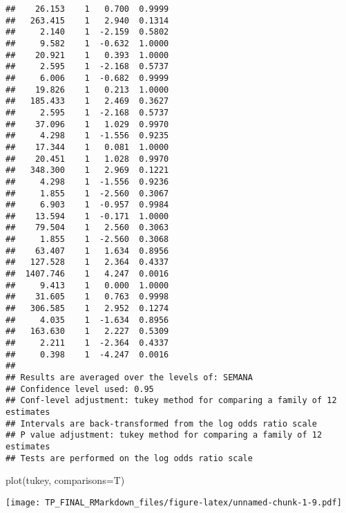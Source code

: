 \documentclass[
]{article}
\newenvironment{Shaded}{\begin{snugshade}}{\end{snugshade}}
\newcommand{\AttributeTok}[1]{\textcolor[rgb]{0.77,0.63,0.00}{#1}}
\newcommand{\FunctionTok}[1]{\textcolor[rgb]{0.00,0.00,0.00}{#1}}
\newcommand{\NormalTok}[1]{#1}
\begin{document}
\begin{verbatim}
##    26.153    1   0.700  0.9999
##   263.415    1   2.940  0.1314
##     2.140    1  -2.159  0.5802
##     9.582    1  -0.632  1.0000
##    20.921    1   0.393  1.0000
##     2.595    1  -2.168  0.5737
##     6.006    1  -0.682  0.9999
##    19.826    1   0.213  1.0000
##   185.433    1   2.469  0.3627
##     2.595    1  -2.168  0.5737
##    37.096    1   1.029  0.9970
##     4.298    1  -1.556  0.9235
##    17.344    1   0.081  1.0000
##    20.451    1   1.028  0.9970
##   348.300    1   2.969  0.1221
##     4.298    1  -1.556  0.9236
##     1.855    1  -2.560  0.3067
##     6.903    1  -0.957  0.9984
##    13.594    1  -0.171  1.0000
##    79.504    1   2.560  0.3063
##     1.855    1  -2.560  0.3068
##    63.407    1   1.634  0.8956
##   127.528    1   2.364  0.4337
##  1407.746    1   4.247  0.0016
##     9.413    1   0.000  1.0000
##    31.605    1   0.763  0.9998
##   306.585    1   2.952  0.1274
##     4.035    1  -1.634  0.8956
##   163.630    1   2.227  0.5309
##     2.211    1  -2.364  0.4337
##     0.398    1  -4.247  0.0016
## 
## Results are averaged over the levels of: SEMANA 
## Confidence level used: 0.95 
## Conf-level adjustment: tukey method for comparing a family of 12 estimates 
## Intervals are back-transformed from the log odds ratio scale 
## P value adjustment: tukey method for comparing a family of 12 estimates 
## Tests are performed on the log odds ratio scale
\end{verbatim}

\begin{Shaded}
\begin{Highlighting}[]
\FunctionTok{plot}\NormalTok{(tukey, }\AttributeTok{comparisons=}\NormalTok{T) }
\end{Highlighting}
\end{Shaded}

\texttt{[image: TP\_FINAL\_RMarkdown\_files/figure-latex/unnamed-chunk-1-9.pdf]}
\end{document}
